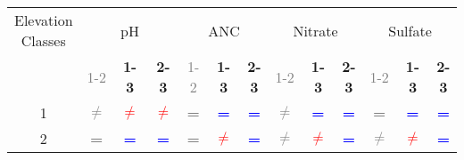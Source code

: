 \begin{table}\scriptsize
\begin{center}
\begin{tabular}{ccccccccccccc}
\toprule
\multicolumn{1}{p{1cm}}{Elevation Classes}& \multicolumn{ 3}{c}{pH}                                                                                            & \multicolumn{ 3}{c}{ANC}                                                                                             & \multicolumn{ 3}{c}{Nitrate}                                                                                                                           & \multicolumn{ 3}{c}{Sulfate}                                 \\ \cline{2-13}\noalign{\smallskip}
                                                                       & \multicolumn{ 1}{c}{\textcolor{gray}{1-2}} & \textbf{1-3}    &\textbf{2-3}          & \textcolor{gray}{1-2}                                    & \textbf{1-3}     & \textbf{2-3}          & \textcolor{gray}{1-2}                                           & \textbf{1-3}                      & \textbf{2-3}                     & \textcolor{gray}{1-2}                       & \textbf{1-3}                     & \textbf{2-3}             \\  \cline{2-13}
\multicolumn{1}{c}{1}                                    & \textcolor{gray}{\textbf{$\neq$}}               & \textcolor{red}{\textbf{$\neq$}}             & \textcolor{red}{\textbf{$\neq$}}                  & \textcolor{gray}{\textbf{=}}                        & \textcolor{blue}{\textbf{=}}                         & \textcolor{blue}{\textbf{=}}                              & \textcolor{gray}{\textbf{$\neq$}}                      & \textcolor{blue}{\textbf{=}}           & \textcolor{blue}{\textbf{=}}           & \textcolor{gray}{\textbf{=}}          & \textcolor{blue}{\textbf{=}}         & \textcolor{blue}{\textbf{=}}  \\ 
\multicolumn{1}{c}{2}                                    & \textcolor{gray}{\textbf{=}}                        & \textcolor{blue}{\textbf{=}}                     & \textcolor{blue}{\textbf{=}}                            & \textcolor{gray}{\textbf{=}}                        & \textcolor{red}{\textbf{$\neq$}}             & \textcolor{blue}{\textbf{=}}                               & \textcolor{gray}{\textbf{$\neq$}}                      & \textcolor{red}{\textbf{$\neq$}} & \textcolor{blue}{\textbf{=}}           & \textcolor{gray}{\textbf{$\neq$}} & \textcolor{red}{\textbf{$\neq$}}  & \textcolor{blue}{\textbf{=}}  \\ 

\end{tabular}
\end{center}
\end{table}
